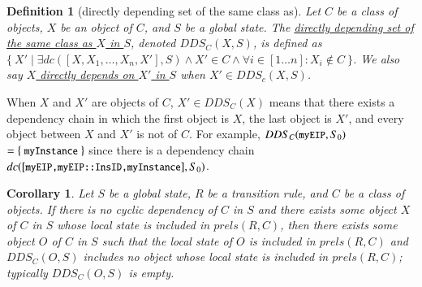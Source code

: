 \documentclass[12pt]{report}
\newtheorem{corollary}{Corollary}
\newtheorem{definition}{Definition}
\newcommand{\mbstt}[1]{\mbox{\small{\tt {#1}}}}
\newcommand{\ul}{\underline}
\begin{document}
\begin{definition}[directly depending set of the same class as]
Let $C$ be a class of objects, $X$ be an object of $C$, and $S$ be a
global state. The \ul{directly depending set of the same class as $X$
  in $S$}, denoted \ul{$DDS_C(X,S)$}, is defined as $\{~X'\mid\exists
dc([X,X_1,\dots,X_n,X'],S)\land X' \in C\land\forall i\in [1 \dots
  n]:X_i \not\in C~\}$. We also say \ul{$X$ directly depends on $X'$
  in $S$} when $X'\in DDS_c(X,S)$.
\end{definition}
When $X$ and $X'$ are objects of $C$, $X' \in DDS_C(X)$ means that
there exists a dependency chain in which the first object is $X$, the
last object is $X'$, and every object between $X$ and $X'$ is not of
$C$. For example, $DDS_C(\mbstt{myEIP},S_0)$ $=\{~\mbstt{myInstance}~\}$
since there is a dependency chain
$dc([\mbstt{myEIP,myEIP::InsID,myInstance}],S_0)$.

\begin{corollary}
Let $S$ be a global state, $R$ be a transition rule, and $C$ be a
class of objects. If there is no cyclic dependency of $C$ in $S$ and
there exists some object $X$ of $C$ in $S$ whose local state is
included in $prels(R,C)$, then there exists some object $O$ of $C$ in
$S$ such that the local state of $O$ is included in $prels(R,C)$ and
$DDS_C(O,S)$ includes no object whose local state is included in
$prels(R,C)$; typically $DDS_C(O,S)$ is empty.
\end{corollary}
\end{document}
